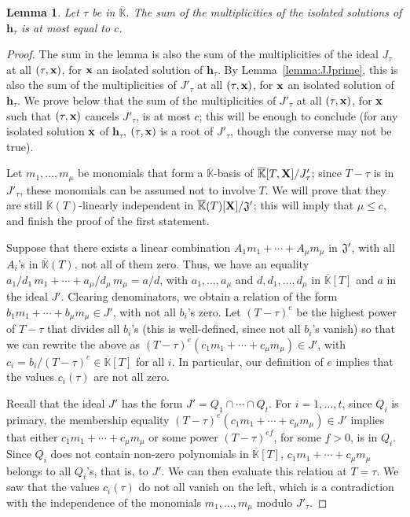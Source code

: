 \documentclass[11pt]{article}
\numberwithin{Property}{section}
\numberwithin{Theorem}{section}
\numberwithin{Proposition}{section}
\newtheorem{Lemma}{Lemma}%
\numberwithin{Lemma}{section}
\numberwithin{Corollary}{section}
\numberwithin{Definition}{section}
\numberwithin{Remark}{section}
\numberwithin{Conjecture}{section}
\numberwithin{Problem}{section}
\numberwithin{Claim}{section}
\theoremstyle{definition}
\numberwithin{Example}{section}
\def\h {\ensuremath{\mathbf{h}}}
\renewcommand{\le}{\leqslant}
\def\bar{\overline}
\renewcommand{\le}{\leqslant} %
\newcommand{\field}{\mathbb{K}} %
\newcommand{\mat}[1]{\mathbf{\MakeUppercase{#1}}} %
\begin{document}
\begin{Lemma}\label{lemma:19}
  Let $\tau$ be in $\bar{\field}$. The sum of the multiplicities of the
  isolated solutions of $\h_\tau$ is at most equal to $c$.
\end{Lemma}
\begin{proof}
 The sum in the lemma is also the sum of the multiplicities of the
  ideal $J_\tau$ at all $(\tau,{\bf x})$, for ${\bf x}$ an isolated solution of
  $\h_\tau$.  By Lemma~\ref{lemma:JJprime}, this is also the sum of
  the multiplicities of $J'_\tau$ at all $(\tau,{\bf x})$, for ${\bf x}$ an
  isolated solution of $\h_\tau$. We prove below that the sum of the
  multiplicities of $J'_\tau$ at all $(\tau,{\bf x})$, for ${\bf x}$ such that
  $(\tau,{\bf x})$ cancels $J'_\tau$, is at most $c$; this will be enough
  to conclude (for any isolated solution ${\bf x}$ of $\h_\tau$,
  $(\tau, {\bf x})$ is a root of $J'_\tau$, though the converse may not be
  true).
  
  Let $m_1,\dots,m_\mu$ be monomials that form a $\bar{\field}$-basis of
  $\bar{\field}[T, \mat{X}]/J'_\tau$; since $T-\tau$ is in $J'_\tau$, these
  monomials can be assumed not to involve $T$.  We will prove that
  they are still $\bar{\field}(T)$-linearly independent in
  $\bar{\field}(T)[\mat{X}]/{\frak J}'$; this will imply that $\mu \le c$,
  and finish the proof of the first statement.
  
   Suppose that there exists a linear combination $A_1 m_1 + \cdots +
  A_\mu m_\mu$ in ${\frak J}'$, with all $A_i$'s in $\bar{\field}(T)$, not
  all of them zero. Thus, we have an equality $a_1/d_1\, m_1 + \cdots
  + a_\mu/d_\mu\, m_\mu = a/d$, with $a_1,\dots,a_\mu$ and
  $d,d_1,\dots,d_\mu$ in $\bar{\field}[T]$ and $a$ in the ideal
  $J'$. Clearing denominators, we obtain a relation of the form $b_1
  m_1 +\cdots+ b_\mu m_\mu \in J'$, with not all $b_i$'s zero. Let
  $(T-\tau)^e$ be the highest power of $T-\tau$ that divides all
  $b_i$'s (this is well-defined, since not all $b_i$'s vanish) so that
  we can rewrite the above as $(T-\tau)^e (c_1 m_1 +\cdots+ c_\mu
  m_\mu) \in J'$, with $c_i=b_i/(T-\tau)^e \in \bar{\field}[T]$ for all $i$.
  In particular, our definition of $e$ implies that the values
  $c_i(\tau)$ are not all zero.
  
  
  Recall that the ideal $J'$ has the form $J'=Q_1 \cap \cdots \cap
  Q_t$. For $i=1,\dots,t$, since $Q_i$ is primary, the membership
  equality $(T-\tau)^e (c_1 m_1 +\cdots +c_\mu m_\mu) \in J'$ implies
  that either $c_1 m_1 +\cdots +c_\mu m_\mu$ or some power
  $(T-\tau)^{ef}$, for some $f > 0$, is in $Q_i$. Since $Q_i$ does not
  contain non-zero polynomials in $\bar{\field}[T]$, $c_1 m_1 +\cdots+ c_\mu
  m_\mu$ belongs to all $Q_i$'s, that is, to $J'$. We can then
  evaluate this relation at $T=\tau$. We saw that the values
  $c_i(\tau)$ do not all vanish on the left, which is a contradiction
  with the independence of the monomials $m_1,\dots,m_\mu$ modulo
  $J'_\tau$.
\end{proof}
\end{document}
